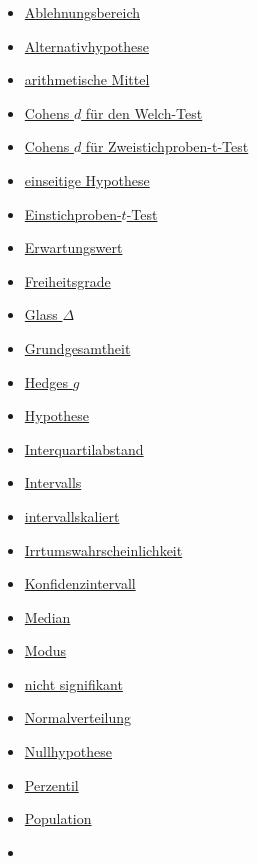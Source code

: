 \documentclass[
]{book}
\providecommand{\tightlist}{%
  \setlength{\itemsep}{0pt}\setlength{\parskip}{0pt}}
\theoremstyle{definition}
\theoremstyle{definition}
\theoremstyle{definition}
\theoremstyle{definition}
\theoremstyle{remark}
\begin{document}
\begin{itemize}
\tightlist
\item
  \hyperref[customdef-ablehnungsbereich]{Ablehnungsbereich}
\item
  \hyperref[customdef-alternativhypothese]{Alternativhypothese}
\item
  \hyperref[customdef-arithmetisches-mittel]{arithmetische Mittel}
\item
  \hyperref[customdef-welch-cohens-d]{Cohens \(d\) für den Welch-Test}
\item
  \hyperref[customdef-cohens-d]{Cohens \(d\) für Zweistichproben-t-Test}
\item
  \hyperref[customdef-einseitige-hypothese]{einseitige Hypothese}
\item
  \hyperref[customdef-t-test]{Einstichproben-\(t\)-Test}
\item
  \hyperref[customdef-erwartungswert]{Erwartungswert}
\item
  \hyperref[customdef-freiheitsgrade]{Freiheitsgrade}
\item
  \hyperref[customdef-glass-delta]{Glass \(\Delta\)}
\item
  \hyperref[customdef-grundgesamtheit]{Grundgesamtheit}
\item
  \hyperref[customdef-hedges-g]{Hedges \(g\)}
\item
  \hyperref[customdef-hypothese]{Hypothese}
\item
  \hyperref[customdef-iqr]{Interquartilabstand}
\item
  \hyperref[customdef-interval]{Intervalls}
\item
  \hyperref[customdef-intervallskaliert]{intervallskaliert}
\item
  \hyperref[customdef-erring-level]{Irrtumswahrscheinlichkeit}
\item
  \hyperref[customdef-confidence-interval]{Konfidenzintervall}
\item
  \hyperref[customdef-median]{Median}
\item
  \hyperref[customdef-modus]{Modus}
\item
  \hyperref[customdef-signifikanz]{nicht signifikant}
\item
  \hyperref[customdef-normalverteilung]{Normalverteilung}
\item
  \hyperref[customdef-nullhypothese]{Nullhypothese}
\item
  \hyperref[customdef-perzentil]{Perzentil}
\item
  \hyperref[customdef-population]{Population}
\item

\end{itemize}
\end{document}
